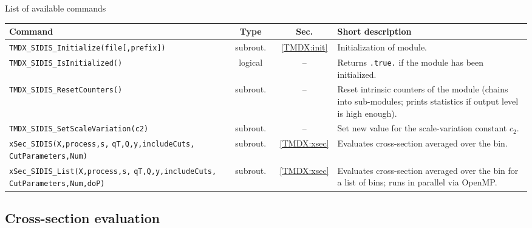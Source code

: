 \documentclass[prd,nofootinbib,eqsecnum,final]{revtex4}
\renewcommand{\(}{\left(}
\renewcommand{\)}{\right)}
\renewcommand{\[}{\left[}
\renewcommand{\]}{\right]}
\begin{document}
\begin{center}
List of available commands
\\
\begin{tabular}{||p{6cm}|c|c|p{8cm}||}
\hline\hline
Command & ~~Type~~& ~~Sec.~~ & Short description
\\\hline
\texttt{TMDX{\_}SIDIS{\_}Initialize(file[,prefix])} & subrout. & \ref{TMDX:init} & Initialization of module.
\\\hline
\texttt{TMDX{\_}SIDIS{\_}IsInitialized()} & logical & -- & Returns \texttt{.true.} if the module has been initialized.
\\\hline
\texttt{TMDX{\_}SIDIS{\_}ResetCounters()} & subrout. & -- & Reset intrinsic counters of the module (chains into sub-modules; prints statistics if output level is high enough).
\\\hline
\texttt{TMDX{\_}SIDIS{\_}SetScaleVariation(c2)} & subrout. & -- & Set new value for the scale-variation constant $c_2$.
\\\hline
\texttt{xSec\_SIDIS(X,process,s,} \texttt{qT,Q,y,includeCuts,} \texttt{CutParameters,Num)} &subrout. &\ref{TMDX:xsec} & Evaluates cross-section averaged over the bin.
\\\hline
\texttt{xSec\_SIDIS\_List(X,process,s,} \texttt{qT,Q,y,includeCuts,} \texttt{CutParameters,Num,doP)} &subrout. &\ref{TMDX:xsec} & Evaluates cross-section averaged over the bin for a list of bins; runs in parallel via OpenMP.
\\\hline\hline
\end{tabular}
\end{center}

\subsection{Cross-section evaluation}
\label{TMDXs:xsec}
\end{document}
